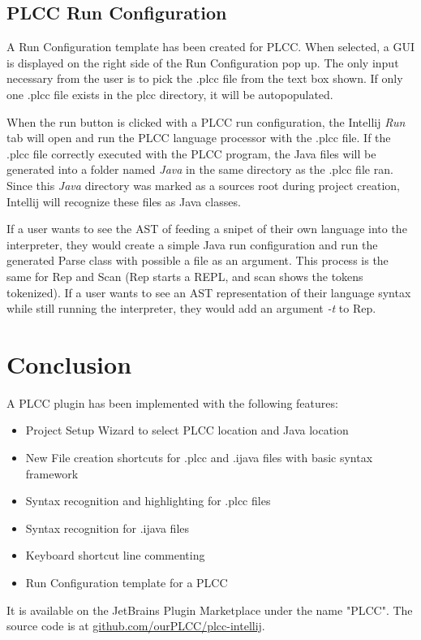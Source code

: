 \documentclass[conference, letterpaper]{IEEEtran}
\begin{document}
\subsection{PLCC Run Configuration}\label{subsec:plcc-run-configuration}
A Run Configuration template has been created for PLCC\@.
When selected, a GUI is displayed on the right side of the Run Configuration pop up.
The only input necessary from the user is to pick the .plcc file from the text box shown.
If only one .plcc file exists in the plcc directory, it will be autopopulated.

When the run button is clicked with a PLCC run configuration, the Intellij \textit{Run} tab will open and run the PLCC language processor with the .plcc file.
If the .plcc file correctly executed with the PLCC program, the Java files will be generated into a folder named \textit{Java} in the same directory as the .plcc file ran.
Since this \textit{Java} directory was marked as a sources root during project creation, Intellij will recognize these files as Java classes.

If a user wants to see the AST of feeding a snipet of their own language into the interpreter, they would create a simple Java run configuration and run the generated Parse class with possible a file as an argument.
This process is the same for Rep and Scan (Rep starts a REPL, and scan shows the tokens tokenized).
If a user wants to see an AST representation of their language syntax while still running the interpreter, they would add an argument \textit{-t} to Rep.


\section{Conclusion}\label{sec:conclusion}
A PLCC plugin has been implemented with the following features:
\begin{itemize}
    \item Project Setup Wizard to select PLCC location and Java location
    \item New File creation shortcuts for .plcc and .ijava files with basic syntax framework
    \item Syntax recognition and highlighting for .plcc files
    \item Syntax recognition for .ijava files
    \item Keyboard shortcut line commenting
    \item Run Configuration template for a PLCC
\end{itemize}
It is available on the JetBrains Plugin Marketplace under the name "PLCC".
The source code is at \href{https://github.com/ourPLCC/plcc-intellij}{github.com/ourPLCC/plcc-intellij}.
\end{document}

